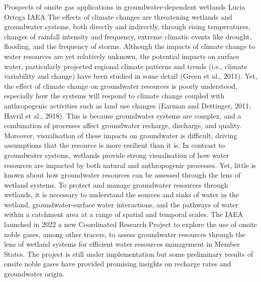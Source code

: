 \begin{conf-abstract}
{Prospects of onsite gas applications in groundwater-dependent wetlands}
{Lucia Ortega}
{IAEA}
{The effects of climate changes are threatening wetlands and groundwater systems, both directly and indirectly, through rising temperatures, changes of rainfall intensity and frequency, extreme climatic events like drought, flooding, and the frequency of storms. Although the impacts of climate change to water resources are yet relatively unknown, the potential impacts on surface water, particularly projected regional climate patterns and trends (i.e., climate variability and change) have been studied in some detail (Green et al., 2011). Yet, the effect of climate change on groundwater resources is poorly understood, especially how the systems will respond to climate change coupled with anthropogenic activities such as land use changes (Earman and Dettinger, 2011; Havril et al., 2018). This is because groundwater systems are complex, and a combination of processes affect groundwater recharge, discharge, and quality. Moreover, visualisation of these impacts on groundwater is difficult, driving assumptions that the resource is more resilient than it is. In contrast to groundwater systems, wetlands provide strong visualisation of how water resources are impacted by both natural and anthropogenic processes. Yet, little is known about how groundwater resources can be assessed through the lens of wetland systems.  
To protect and manage groundwater resources through wetlands, it is necessary to understand the sources and sinks of water in the wetland, groundwater-surface water interactions, and the pathways of water within a catchment area at a range of spatial and temporal scales. The IAEA launched in 2022 a new Coordinated Research Project to explore the use of onsite noble gases, among other tracers, to assess groundwater resources through the lens of wetland systems for efficient water resources management in Member States. The project is still under implementation but some preliminary results of onsite noble gases have  provided promising insights on recharge rates and groundwater origin.}
\end{conf-abstract}

